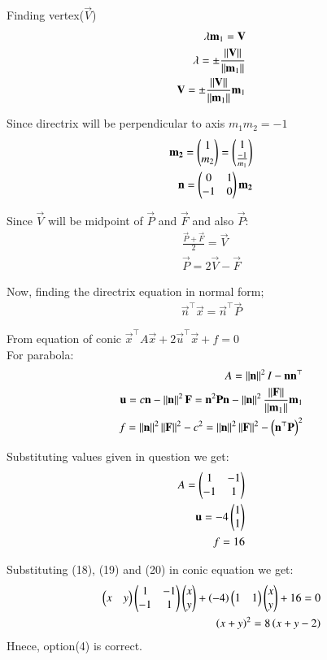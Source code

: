 \documentclass[journal]{IEEEtran}
\begin{document}
Finding vertex($\vec{V}$)
\begin{align}
    \lambda\mathbf{m}_1=\mathbf{V}\\
    \lambda = \pm\frac{\left\lVert\mathbf{V}\right\rVert}{\left\lVert\mathbf{m}_1\right\rVert}\\
    \mathbf{V} = \pm\frac{\left\lVert\mathbf{V}\right\rVert}{\left\lVert\mathbf{m}_1\right\rVert}\mathbf{m}_1
\end{align}

Since directrix will be perpendicular to axis $m_1m_2=-1$
\begin{align}
    \mathbf{m_2} = \begin{pmatrix}1\\m_2\end{pmatrix} = \begin{pmatrix}1\\ \frac{-1}{m_1}\end{pmatrix}\\
    \mathbf{n} = \begin{pmatrix}0&1\\-1&0\end{pmatrix}\mathbf{m_2}
\end{align}

Since $\vec{V}$ will be midpoint of $\vec{P}$ and $\vec{F}$ and also $\vec{P}$:
\begin{align}
    \frac{\vec{P}+\vec{F}}{2} = \vec{V}\\
    \vec{P}=2\vec{V}-\vec{F}
\end{align}

Now, finding the directrix equation in normal form;
\begin{align}
    \vec{n}^\top\vec{x}=\vec{n}^\top\vec{P}
\end{align}

From equation of conic $\vec{x}^\top A\vec{x}+2\vec{u}^\top\vec{x}+f=0$\\
For parabola:
\begin{align}
    A=\left\lVert\mathbf{n}\right\rVert^2I-\mathbf{n}\mathbf{n}^\top\\
    \mathbf{u}=c\mathbf{n}-\left\lVert\mathbf{n}\right\rVert^2\mathbf{F}=\mathbf{n}^2\mathbf{P}\mathbf{n}-\left\lVert\mathbf{n}\right\rVert^2\frac{\left\lVert\mathbf{F}\right\rVert}{\left\lVert\mathbf{m}_1\right\rVert}\mathbf{m}_1\\
    f=\left\lVert\mathbf{n}\right\rVert^2\left\lVert\mathbf{F}\right\rVert^2-c^2=\left\lVert\mathbf{n}\right\rVert^2\left\lVert\mathbf{F}\right\rVert^2-\left(\mathbf{n}^\top\mathbf{P}\right)^2
\end{align}

Substituting values given in question we get:
\begin{align}
    A=\begin{pmatrix}1&-1\\-1&1\end{pmatrix}\\
    \mathbf{u}=-4\begin{pmatrix}1\\1\end{pmatrix}\\
    f=16
\end{align}

Substituting (18), (19) and (20) in conic equation we get:
\begin{align}
    \begin{pmatrix}x&y\end{pmatrix}\begin{pmatrix}1&-1\\-1&1\end{pmatrix}\begin{pmatrix}x\\y\end{pmatrix}+\left(-4\right)\begin{pmatrix}1&1\end{pmatrix}\begin{pmatrix}x\\y\end{pmatrix}+16=0\\
    \left(x+y\right)^2=8\left(x+y-2\right)
\end{align}
Hnece, option(4) is correct.
\end{document}
